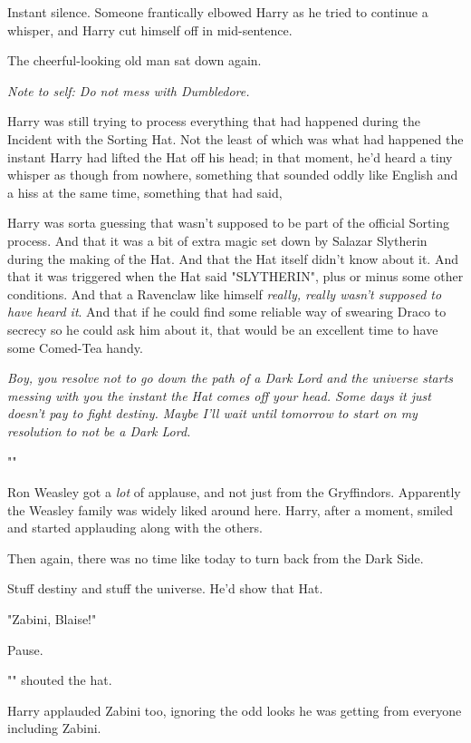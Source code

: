 Instant silence. Someone frantically elbowed Harry as he tried to continue a
whisper, and Harry cut himself off in mid-sentence.

The cheerful-looking old man sat down again.

\emph{Note to self: Do not mess with Dumbledore.}

Harry was still trying to process everything that had happened during the
Incident with the Sorting Hat. Not the least of which was what had happened the
instant Harry had lifted the Hat off his head; in that moment, he'd heard a
tiny whisper as though from nowhere, something that sounded oddly like English
and a hiss at the same time, something that had said, 

Harry was sorta guessing that wasn't supposed to be part of the official
Sorting process. And that it was a bit of extra magic set down by Salazar
Slytherin during the making of the Hat. And that the Hat itself didn't know
about it. And that it was triggered when the Hat said "SLYTHERIN", plus or
minus some other conditions. And that a Ravenclaw like himself \emph{really,
really wasn't supposed to have heard it}. And that if he could find some
reliable way of swearing Draco to secrecy so he could ask him about it, that
would be an excellent time to have some Comed-Tea handy.

\emph{Boy, you resolve not to go down the path of a Dark Lord and the universe
starts messing with you the instant the Hat comes off your head. Some days it
just doesn't pay to fight destiny. Maybe I'll wait until tomorrow to start on
my resolution to not be a Dark Lord.}

""

Ron Weasley got a \emph{lot} of applause, and not just from the Gryffindors.
Apparently the Weasley family was widely liked around here. Harry, after a
moment, smiled and started applauding along with the others.

Then again, there was no time like today to turn back from the Dark Side.

Stuff destiny and stuff the universe. He'd show that Hat.

"Zabini, Blaise!"

Pause.

"" shouted the hat.

Harry applauded Zabini too, ignoring the odd looks he was getting from everyone
including Zabini.

